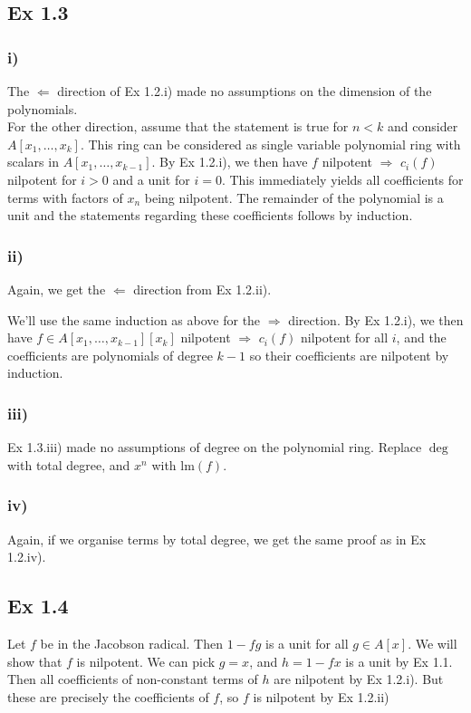 \documentclass{article}
\theoremstyle{definition}
\newcommand{\lm}{\text{lm}}
\begin{document}
\subsection*{Ex 1.3}
\subsubsection*{i)}
The $\Leftarrow$ direction of Ex 1.2.i) made no assumptions on the dimension of the polynomials. \\

For the other direction, assume that the statement is true for $n < k$ and
consider $A[x_1, \ldots, x_k]$. This ring can be considered as single variable
polynomial ring with scalars in $A[x_1, \ldots, x_{k - 1}]$. By Ex 1.2.i), we
then have $f$ nilpotent $\Rightarrow$ $c_i(f)$ nilpotent for $i > 0$ and a unit
for $i = 0$. This immediately yields all coefficients for terms with factors of
$x_n$ being nilpotent. The remainder of the polynomial is a unit and the
statements regarding these coefficients follows by induction.

\subsubsection*{ii)}
Again, we get the $\Leftarrow$ direction from Ex 1.2.ii).

We'll use the same induction as above for the $\Rightarrow$ direction. By Ex
1.2.i), we then have $f \in A[x_1, \ldots, x_{k - 1}][x_k]$ nilpotent
$\Rightarrow$ $c_i(f)$ nilpotent for all $i$, and the coefficients are
polynomials of degree $k - 1$ so their coefficients are nilpotent by induction.

\subsubsection*{iii)}

Ex 1.3.iii) made no assumptions of degree on the polynomial ring. Replace
$\deg$ with total degree, and $x^n$ with $\lm(f)$.

\subsubsection*{iv)}
Again, if we organise terms by total degree, we get the same proof as in Ex 1.2.iv).

\subsection*{Ex 1.4}
Let $f$ be in the Jacobson radical. Then $1 - fg$ is a unit for all $g \in
	A[x]$. We will show that $f$ is nilpotent. We can pick $g = x$, and $h = 1 -
	fx$ is a unit by Ex 1.1. Then all coefficients of non-constant terms of $h$ are
nilpotent by Ex 1.2.i). But these are precisely the coefficients of $f$, so $f$
is nilpotent by Ex 1.2.ii)
\end{document}
